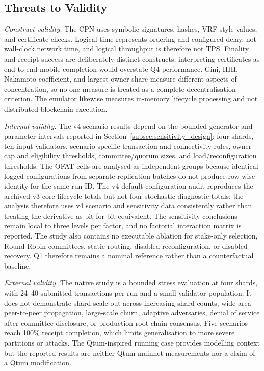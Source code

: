 \documentclass[a4paper,fleqn]{cas-sc}
\begin{document}
\FloatBarrier

\subsection{Threats to Validity}
\label{subsec:validity}

\textit{Construct validity.}
The CPN uses symbolic signatures, hashes, VRF-style values, and certificate
checks. Logical time represents ordering and configured delay, not wall-clock
network time, and logical throughput is therefore not TPS. Finality and receipt
success are deliberately distinct constructs; interpreting certificates as
end-to-end mobile completion would overstate Q4 performance. Gini, HHI,
Nakamoto coefficient, and largest-owner share measure different aspects of
concentration, so no one measure is treated as a complete decentralisation
criterion. The emulator likewise measures in-memory lifecycle processing and
not distributed blockchain execution.

\textit{Internal validity.}
The v4 scenario results depend on the bounded generator and parameter
intervals reported in Section~\ref{subsec:sensitivity_design}: four shards,
ten input validators, scenario-specific transaction and connectivity rules,
owner cap and eligibility thresholds, committee/quorum sizes, and
load/reconfiguration thresholds. The OFAT cells are analysed as independent
groups because identical logged configurations from separate replication
batches do not produce row-wise identity for the same run ID. The v4 default-configuration audit
reproduces the archived v3 core lifecycle totals but not four stochastic
diagnostic totals; the analysis therefore uses v4 scenario and
sensitivity data consistently rather than treating the derivative as
bit-for-bit equivalent. The sensitivity conclusions remain local to three
levels per factor, and no factorial interaction matrix is reported. The study
also contains no executable ablation for stake-only selection, Round-Robin
committees, static routing, disabled reconfiguration, or disabled recovery. Q1
therefore remains a nominal reference rather than a counterfactual baseline.

\textit{External validity.}
The native study is a bounded stress evaluation at four shards, with 24--40
submitted transactions per run and a small validator population. It does not
demonstrate shard scale-out across increasing shard counts, wide-area
peer-to-peer propagation, large-scale churn, adaptive adversaries, denial of
service after committee disclosure, or production root-chain consensus. Five
scenarios reach 100\% receipt completion, which limits generalisation to more
severe partitions or attacks. The Qtum-inspired running case provides modelling
context but the reported results are neither Qtum mainnet measurements nor a
claim of a Qtum modification.
\end{document}
